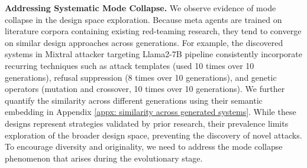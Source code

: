 \textbf{Addressing Systematic Mode Collapse.} We observe evidence of mode collapse \citep{jiang2025artificialhivemindopenendedhomogeneity} in the design space exploration. Because meta agents are trained on literature corpora containing existing red-teaming research, they tend to converge on similar design approaches across generations. For example, the discovered systems in Mixtral attacker targeting Llama2-7B pipeline consistently incorporate recurring techniques such as attack templates (used 10 times over 10 generations), refusal suppression (8 times over 10 generations), and genetic operators (mutation and crossover, 10 times over 10 generations). We further quantify the similarity across different generations using their semantic embedding in Appendix \ref{appx: similarity across generated systems}. While these designs represent strategies validated by prior research, their prevalence limits exploration of the broader design space, preventing the discovery of novel attacks. To encourage diversity and originality, we need to address the mode collapse phenomenon that arises during the evolutionary stage.




